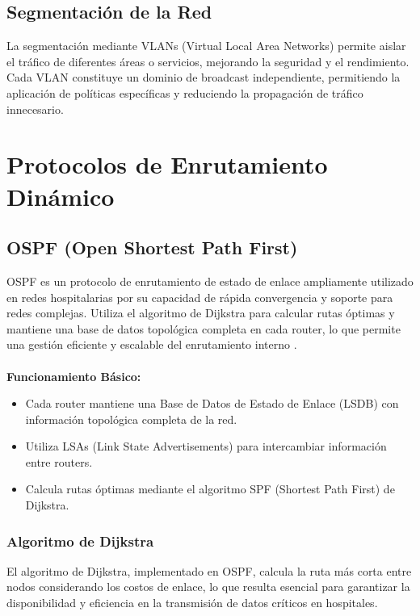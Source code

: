 \subsection{Segmentación de la Red}
La segmentación mediante \acs{VLAN}s (Virtual Local Area Networks) permite aislar el tráfico de diferentes áreas o servicios, mejorando la seguridad y el rendimiento. 
Cada \acs{VLAN} constituye un dominio de broadcast independiente, permitiendo la aplicación de políticas específicas y reduciendo la propagación de tráfico innecesario.

\section{Protocolos de Enrutamiento Dinámico}
\subsection{OSPF (Open Shortest Path First)}
\label{subsec:ospf}
\acs{OSPF} es un protocolo de enrutamiento de estado de enlace ampliamente utilizado en redes hospitalarias por su capacidad de rápida convergencia y soporte para redes complejas. 
Utiliza el algoritmo de Dijkstra para calcular rutas óptimas y mantiene una base de datos topológica completa en cada router, lo que permite una gestión eficiente y escalable 
del enrutamiento interno \cite{cisco-ospf}.
\\ \\
\textbf{Funcionamiento Básico:}
\begin{itemize}
    \item Cada router mantiene una Base de Datos de Estado de Enlace (\acs{LSDB}) con información topológica completa de la red.
    \item Utiliza \acs{LSA}s (Link State Advertisements) para intercambiar información entre routers.
    \item Calcula rutas óptimas mediante el algoritmo \acs{SPF} (Shortest Path First) de Dijkstra.
\end{itemize}

\subsubsection{Algoritmo de Dijkstra}
El algoritmo de Dijkstra, implementado en OSPF, calcula la ruta más corta entre nodos considerando los costos de enlace, lo que resulta esencial para garantizar la disponibilidad 
y eficiencia en la transmisión de datos críticos en hospitales.

